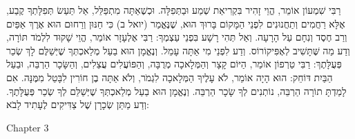 רַבִּי שִׁמְעוֹן אוֹמֵר, הֱוֵי זָהִיר בִּקְרִיאַת שְׁמַע וּבַתְּפִלָּה. וּכְשֶׁאַתָּה מִתְפַּלֵּל, אַל תַּעַשׂ תְּפִלָּתְךָ קֶבַע, אֶלָּא רַחֲמִים וְתַחֲנוּנִים לִפְנֵי הַמָּקוֹם בָּרוּךְ הוּא, שֶׁנֶּאֱמַר (יואל ב) כִּי חַנּוּן וְרַחוּם הוּא אֶרֶךְ אַפַּיִם וְרַב חֶסֶד וְנִחָם עַל הָרָעָה. וְאַל תְּהִי רָשָׁע בִּפְנֵי עַצְמְךָ:
רַבִּי אֶלְעָזָר אוֹמֵר, הֱוֵי שָׁקוּד לִלְמֹד תּוֹרָה, וְדַע מַה שֶּׁתָּשִׁיב לְאֶפִּיקוֹרוֹס. וְדַע לִפְנֵי מִי אַתָּה עָמֵל. וְנֶאֱמָן הוּא בַעַל מְלַאכְתְּךָ שֶׁיְּשַׁלֶּם לָךְ שְׂכַר פְּעֻלָּתֶךְ:
רַבִּי טַרְפוֹן אוֹמֵר, הַיּוֹם קָצָר וְהַמְּלָאכָה מְרֻבָּה, וְהַפּוֹעֲלִים עֲצֵלִים, וְהַשָּׂכָר הַרְבֵּה, וּבַעַל הַבַּיִת דּוֹחֵק:
הוּא הָיָה אוֹמֵר, לֹא עָלֶיךָ הַמְּלָאכָה לִגְמֹר, וְלֹא אַתָּה בֶן חוֹרִין לִבָּטֵל מִמֶּנָּה. אִם לָמַדְתָּ תוֹרָה הַרְבֵּה, נוֹתְנִים לְךָ שָׂכָר הַרְבֵּה. וְנֶאֱמָן הוּא בַעַל מְלַאכְתְּךָ שֶׁיְּשַׁלֵּם לְךָ שְׂכַר פְּעֻלָּתֶךָ. וְדַע מַתַּן שְׂכָרָן שֶׁל צַדִּיקִים לֶעָתִיד לָבֹא:

Chapter 3

